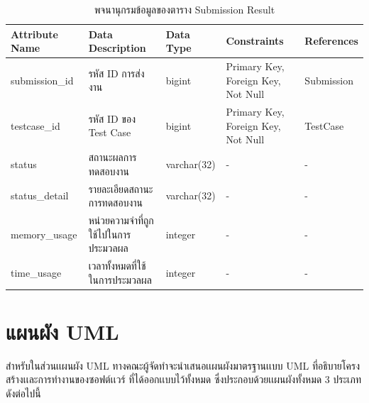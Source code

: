 \documentclass[12pt,one side,openright,a4paper]{cpe-thesis-th}
\newcommand{\thaijustify}[1]{%
  \par\hspace{30pt}\justifying
  #1
}
\begin{document}
     \begin{table}[H]
        \centering
        \caption{พจนานุกรมข้อมูลของตาราง Submission Result}
        \label{tbl:data-dict-submission_result}
            \begin{tabular}{p{2cm}|p{4cm}p{2cm}p{3cm}p{2cm}} \hline\hline
            Attribute Name & Data Description & Data Type & Constraints & References \\ \hline\hline
            submission\_id & รหัส ID การส่งงาน & bigint & Primary Key, Foreign Key, Not Null & Submission \\
            testcase\_id & รหัส ID ของ Test Case & bigint & Primary Key, Foreign Key, Not Null & TestCase \\
            status & สถานะผลการทดสอบงาน & varchar(32) & - & - \\
            status\_detail & รายละเอียดสถานะการทดสอบงาน & varchar(32) & - & - \\
            memory\_usage & หน่วยความจำที่ถูกใช้ไปในการประมวลผล & integer & - & - \\
            time\_usage & เวลาทั้งหมดที่ใช้ในการประมวลผล & integer & - & - \\ \hline\hline
            \end{tabular}   
    \end{table}
\section{แผนผัง UML}
\thaijustify{
    สำหรับในส่วนเเผนผัง UML ทางคณะผู้จัดทำจะนำเสนอเเผนผังมาตรฐานเเบบ UML ที่อธิบายโครงสร้างเเละการทำงานของซอฟต์เเวร์ ที่ได้ออกเเบบไว้ทั้งหมด ซึ่งประกอบด้วยเเผนผังทั้งหมด 3 ประเภทดังต่อไปนี้
}
\end{document}
